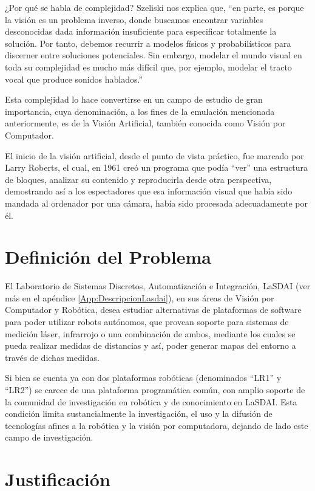 ¿Por qué se habla de complejidad? Szeliski nos explica que, ``en parte, es porque la visión es un problema inverso, donde buscamos encontrar variables desconocidas dada información insuficiente para especificar totalmente la solución. Por tanto, debemos recurrir a modelos físicos y probabilísticos para discerner entre soluciones potenciales. Sin embargo, modelar el mundo visual en toda su complejidad es mucho más difícil que, por ejemplo, modelar el tracto vocal que produce sonidos hablados.'' \citep{RS:09}

Esta complejidad lo hace convertirse en un campo de estudio de gran importancia, cuya denominación, a los fines de la emulación mencionada anteriormente, es de la Visión Artificial, también conocida como Visión por Computador.

El inicio de la visión artificial, desde el punto de vista práctico, fue marcado por Larry Roberts, el cual, en 1961 creó un programa que podía ``ver'' una estructura de bloques, analizar su contenido y reproducirla desde otra perspectiva, demostrando así a los espectadores que esa información visual que había sido mandada al ordenador por una cámara, había sido procesada adecuadamente por él. \citep{bb68865}

\section{Definición del Problema}

El Laboratorio de Sistemas Discretos, Automatización e Integración, LaSDAI (ver más en el apéndice \ref{App:DescripcionLasdai}), en sus áreas de Visión por Computador y Robótica, desea estudiar alternativas de plataformas de software para poder utilizar robots autónomos, que provean soporte para sistemas de medición láser, infrarrojo o una combinación de ambos, mediante los cuales se pueda realizar medidas de distancias y así, poder generar mapas del entorno a través de dichas medidas.

Si bien se cuenta ya con dos plataformas robóticas (denominados ``LR1'' y ``LR2'') se carece de una plataforma programática común, con amplio soporte de la comunidad de investigación en robótica y de conocimiento en LaSDAI\@. Esta condición limita sustancialmente la investigación, el uso y la difusión de tecnologías afines a la robótica y la visión por computadora, dejando de lado este campo de investigación.

\section{Justificación}

